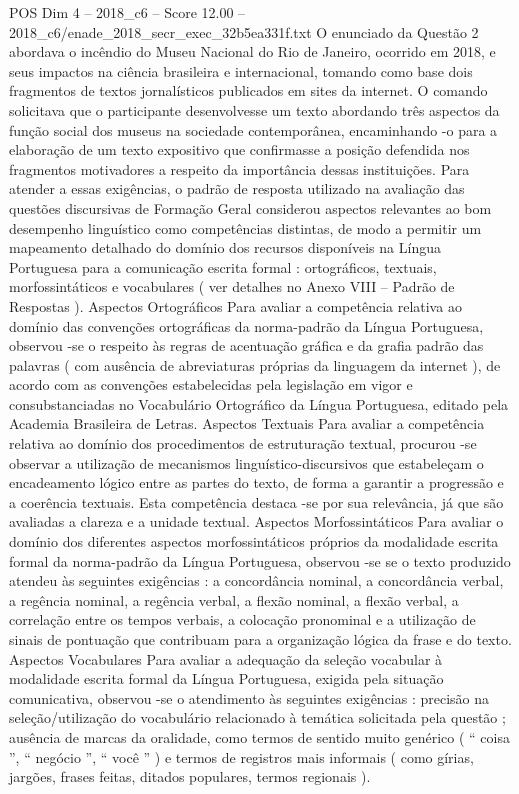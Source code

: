 \begin{textsample}{POS Dim 4 – 2018\_c6 – Score 12.00 – 2018\_c6/enade\_2018\_secr\_exec\_32b5ea331f.txt}
O enunciado da Questão 2 abordava o incêndio do Museu Nacional do Rio de Janeiro, ocorrido em 2018, e seus impactos na ciência brasileira e internacional, tomando como base dois fragmentos de textos jornalísticos publicados em sites da internet.
O comando solicitava que o participante desenvolvesse um texto abordando três aspectos da função social dos museus na sociedade contemporânea, encaminhando -o para a elaboração de um texto expositivo que confirmasse a posição defendida nos fragmentos motivadores a respeito da importância dessas instituições.
Para atender a essas exigências, o padrão de resposta utilizado na avaliação das questões discursivas de Formação Geral considerou aspectos relevantes ao bom desempenho linguístico como competências distintas, de modo a permitir um mapeamento detalhado do domínio dos recursos disponíveis na Língua Portuguesa para a comunicação escrita formal : ortográficos, textuais, morfossintáticos e vocabulares ( ver detalhes no Anexo VIII – Padrão de Respostas ).
Aspectos Ortográficos Para avaliar a competência relativa ao domínio das convenções ortográficas da norma-padrão da Língua Portuguesa, observou -se o respeito às regras de acentuação gráfica e da grafia padrão das palavras ( com ausência de abreviaturas próprias da linguagem da internet ), de acordo com as convenções estabelecidas pela legislação em vigor e consubstanciadas no Vocabulário Ortográfico da Língua Portuguesa, editado pela Academia Brasileira de Letras.
Aspectos Textuais Para avaliar a competência relativa ao domínio dos procedimentos de estruturação textual, procurou -se observar a utilização de mecanismos linguístico-discursivos que estabeleçam o encadeamento lógico entre as partes do texto, de forma a garantir a progressão e a coerência textuais.
Esta competência destaca -se por sua relevância, já que são avaliadas a clareza e a unidade textual.
Aspectos Morfossintáticos Para avaliar o domínio dos diferentes aspectos morfossintáticos próprios da modalidade escrita formal da norma-padrão da Língua Portuguesa, observou -se se o texto produzido atendeu às seguintes exigências : a concordância nominal, a concordância verbal, a regência nominal, a regência verbal, a flexão nominal, a flexão verbal, a correlação entre os tempos verbais, a colocação pronominal e a utilização de sinais de pontuação que contribuam para a organização lógica da frase e do texto.
Aspectos Vocabulares Para avaliar a adequação da seleção vocabular à modalidade escrita formal da Língua Portuguesa, exigida pela situação comunicativa, observou -se o atendimento às seguintes exigências : precisão na seleção/utilização do vocabulário relacionado à temática solicitada pela questão ; ausência de marcas da oralidade, como termos de sentido muito genérico ( “ coisa ”, “ negócio ”, “ você ” ) e termos de registros mais informais ( como gírias, jargões, frases feitas, ditados populares, termos regionais ).

\end{textsample}
